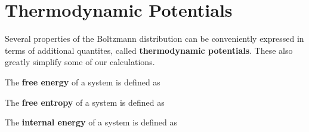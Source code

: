 \documentclass[letterpaper,english,10pt]{article}
\begin{document}
\section{Thermodynamic Potentials}
Several properties of the Boltzmann distribution can be conveniently expressed in terms of additional quantites, called \textbf{thermodynamic potentials}. These also greatly simplify some of our calculations. 

\begin{defn}
The \textbf{free energy} of a system is defined as 
\end{defn}

\begin{defn}
The \textbf{free entropy} of a system is defined as 
\end{defn}

\begin{defn}
The \textbf{internal energy} of a system is defined as 
\end{defn}
\end{document}
